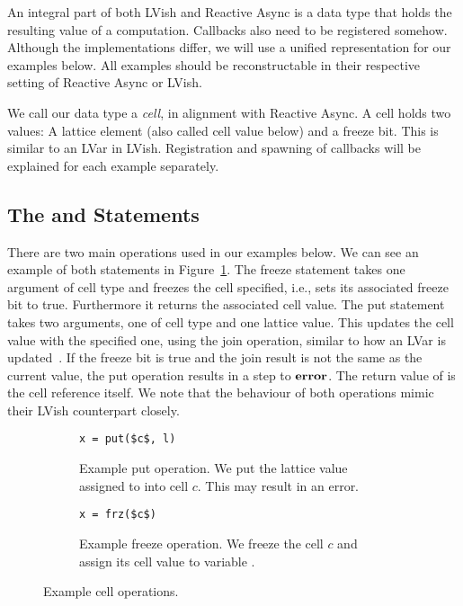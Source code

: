 An integral part of both LVish and Reactive Async is a data type that holds 
the resulting value of a computation. Callbacks also need to be
registered somehow. Although the implementations differ, we will
use a unified representation for our examples below. All examples should be
reconstructable in their respective setting of Reactive Async or LVish.

We call our data type a \emph{cell}, in alignment with Reactive Async. A cell
holds two values: A lattice element (also called cell value below) and a freeze bit.
This is similar to an LVar in LVish. Registration and spawning of callbacks will
be explained for each example separately.

\subsection{The  and  Statements}%
\label{sub:the_put_statement}
There
are two main operations used in our examples below. We can see an example of
both statements in Figure~\ref{fig:ex_cell_op}. The freeze statement
 takes one argument of cell type and freezes the cell specified,
i.e., sets its associated freeze bit to true. Furthermore it returns the
associated cell value. The put statement  takes two arguments, one
of cell type and one lattice value. This updates the cell value with the
specified one, using the join operation, similar to how an LVar is
updated~\parencite{kuper2013lvars}. If the freeze bit is true and the join
result is not the same as the current value, the put operation results in a step
to $\mbox{{\bf error}}$. The return value of  is the cell reference itself.  We
note that the behaviour of both operations mimic their LVish counterpart
closely.


\begin{figure}
  \centering
  \begin{subfigure}[t]{0.4\textwidth}
    \begin{lstlisting}[numbers=none,mathescape=true]
x = put($c$, l)
    \end{lstlisting}
    \caption{Example put operation. We put the lattice value assigned to  into
    cell $c$. This may result in an error.}
  \end{subfigure}
  \quad
  \begin{subfigure}[t]{0.4\textwidth}
    \begin{lstlisting}[numbers=none,mathescape=true]
x = frz($c$)
    \end{lstlisting}
    \caption{Example freeze operation. We freeze the cell $c$ and assign its cell
    value to variable .}
  \end{subfigure}
  \caption{Example cell operations.}
  \label{fig:ex_cell_op}
\end{figure}

